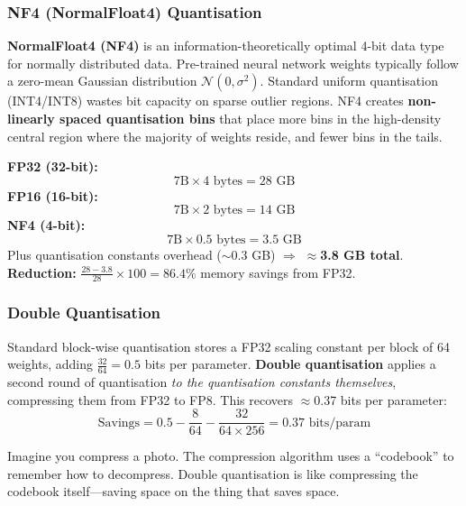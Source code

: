 \subsubsection{NF4 (NormalFloat4) Quantisation}

\begin{acadbox}[\textcolor{white}{Academic Definition}]
\textbf{NormalFloat4 (NF4)} is an information-theoretically optimal 4-bit data type for normally distributed data. Pre-trained neural network weights typically follow a zero-mean Gaussian distribution $\mathcal{N}(0, \sigma^2)$. Standard uniform quantisation (INT4/INT8) wastes bit capacity on sparse outlier regions. NF4 creates \textbf{non-linearly spaced quantisation bins} that place more bins in the high-density central region where the majority of weights reside, and fewer bins in the tails.
\end{acadbox}

\begin{examplebox}[\textcolor{white}{Worked Example: Memory Savings (FP32 → NF4)}]
\textbf{FP32 (32-bit):}
\[
7\text{B} \times 4 \text{ bytes} = 28 \text{ GB}
\]
\textbf{FP16 (16-bit):}
\[
7\text{B} \times 2 \text{ bytes} = 14 \text{ GB}
\]
\textbf{NF4 (4-bit):}
\[
7\text{B} \times 0.5 \text{ bytes} = 3.5 \text{ GB}
\]
Plus quantisation constants overhead ($\sim$0.3 GB) $\Rightarrow$ \textbf{$\approx$3.8 GB total}.\\
\textbf{Reduction:} $\frac{28 - 3.8}{28} \times 100 = 86.4\%$ memory savings from FP32.
\end{examplebox}

\subsubsection{Double Quantisation}

\begin{acadbox}[\textcolor{white}{Academic Definition}]
Standard block-wise quantisation stores a FP32 scaling constant per block of 64 weights, adding $\frac{32}{64} = 0.5$ bits per parameter. \textbf{Double quantisation} applies a second round of quantisation \textit{to the quantisation constants themselves}, compressing them from FP32 to FP8. This recovers $\approx$0.37 bits per parameter:
\[
\text{Savings} = 0.5 - \frac{8}{64} - \frac{32}{64 \times 256} = 0.37 \text{ bits/param}
\]
\end{acadbox}

\begin{analogybox}[\textcolor{white}{Simple Analogy}]
Imagine you compress a photo. The compression algorithm uses a ``codebook'' to remember how to decompress. Double quantisation is like compressing the codebook itself---saving space on the thing that saves space.
\end{analogybox}

